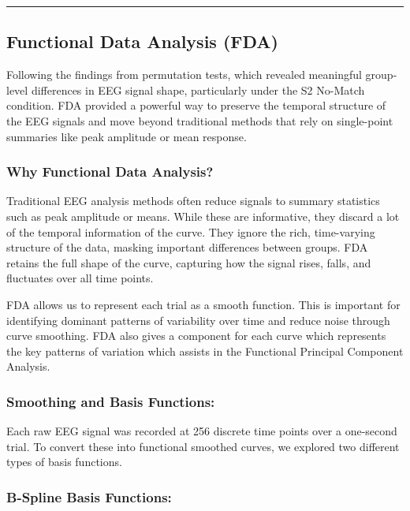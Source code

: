 \documentclass{article}
\begin{document}
\begin{center}\rule{0.5\linewidth}{0.5pt}\end{center}

\subsection{Functional Data Analysis
(FDA)}\label{functional-data-analysis-fda}

Following the findings from permutation tests, which revealed meaningful
group-level differences in EEG signal shape, particularly under the S2
No-Match condition. FDA provided a powerful way to preserve the temporal
structure of the EEG signals and move beyond traditional methods that
rely on single-point summaries like peak amplitude or mean response.

\subsubsection{Why Functional Data
Analysis?}\label{why-functional-data-analysis}

Traditional EEG analysis methods often reduce signals to summary
statistics such as peak amplitude or means. While these are informative,
they discard a lot of the temporal information of the curve. They ignore
the rich, time-varying structure of the data, masking important
differences between groups. FDA retains the full shape of the curve,
capturing how the signal rises, falls, and fluctuates over all time
points.

FDA allows us to represent each trial as a smooth function. This is
important for identifying dominant patterns of variability over time and
reduce noise through curve smoothing. FDA also gives a component for
each curve which represents the key patterns of variation which assists
in the Functional Principal Component Analysis.

\subsubsection{Smoothing and Basis
Functions:}\label{smoothing-and-basis-functions}

Each raw EEG signal was recorded at 256 discrete time points over a
one-second trial. To convert these into functional smoothed curves, we
explored two different types of basis functions.

\subsubsection{B-Spline Basis
Functions:}\label{b-spline-basis-functions}
\end{document}

